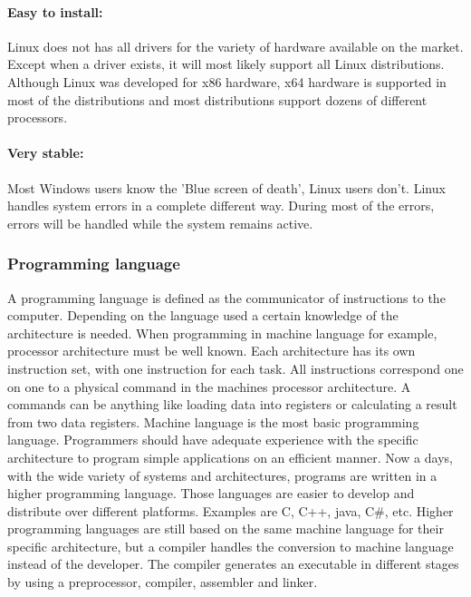 \documentclass[12pt,a4paper,english,twoside,openright]{tutthesis}
\begin{document}
				\paragraph{Easy to install:}
Linux does not has all drivers for the variety of hardware available on the market. Except when a driver exists, it will most likely support all Linux distributions. Although Linux was developed for x86 hardware, x64 hardware is supported in most of the distributions and most distributions support dozens of different processors.
				\paragraph{Very stable:}
Most Windows users know the 'Blue screen of death', Linux users don't. Linux handles system errors in a complete different way. During most of the errors, errors will be handled while the system remains active.
			\subsubsection{Programming language}\label{subsubsec:programLanguage}
A programming language is defined as the communicator of instructions to the computer. Depending on the language used a certain knowledge of the architecture is needed. When programming in machine language for example, processor architecture must be well known. Each architecture has its own instruction set, with one instruction for each task. All instructions correspond one on one to a physical command in the machines processor architecture. A commands can be anything like loading data into registers or calculating a result from two data registers. Machine language is the most basic programming language. Programmers should have adequate experience with the specific architecture to program simple applications on an efficient manner. Now a days, with the wide variety of systems and architectures, programs are written in a higher programming language. Those languages are easier to develop and distribute over different platforms. Examples are C, C++, java, C\#, etc. Higher programming languages are still based on the same machine language for their specific architecture, but a compiler handles the conversion to machine language instead of the developer. The compiler generates an executable in different stages by using a preprocessor, compiler, assembler and linker.
\end{document}
